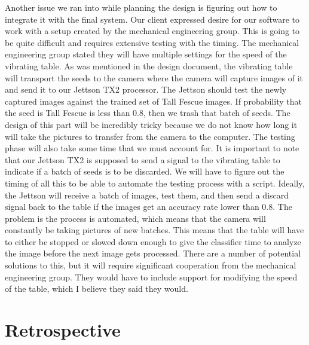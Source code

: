 \documentclass[onecolumn, draftclsnofoot,10pt, compsoc]{IEEEtran}
\begin{document}
	Another issue we ran into while planning the design is figuring out how to integrate it with the final system. Our client expressed desire for our software to work with a setup created by the mechanical engineering group. This is going to be quite difficult and requires extensive testing with the timing. The mechanical engineering group stated they will have multiple settings for the speed of the vibrating table. As was mentioned in the design document, the vibrating table will transport the seeds to the camera where the camera will capture images of it and send it to our Jettson TX2 processor. The Jettson should test the newly captured images against the trained set of Tall Fescue images. If probability that the seed is Tall Fescue is less than 0.8, then we trash that batch of seeds. The design of this part will be incredibly tricky because we do not know how long it will take the pictures to transfer from the camera to the computer. The testing phase will also take some time that we must account for. It is important to note that our Jettson TX2 is supposed to send a signal to the vibrating table to indicate if a batch of seeds is to be discarded. We will have to figure out the timing of all this to be able to automate the testing process with a script. Ideally, the Jettson will receive a batch of images, test them, and then send a discard signal back to the table if the images get an accuracy rate lower than 0.8. The problem is the process is automated, which means that the camera will constantly be taking pictures of new batches. This means that the table will have to either be stopped or slowed down enough to give the classifier time to analyze the image before the next image gets processed. There are a number of potential solutions to this, but it will require significant cooperation from the mechanical engineering group. They would have to include support for modifying the speed of the table, which I believe they said they would.
	
	\section{Retrospective}
	
\end{document}
